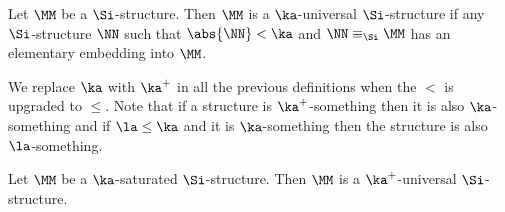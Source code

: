 \begin{dfn}[$\ka$-universality]
    Let $\MM$ be a $\Si$-structure.
    Then $\MM$ is a $\ka$-universal $\Si$-structure if 
    any $\Si$-structure $\NN$ such that $\abs{\NN} < \ka$ and 
    $\NN \equiv_\Si \MM$ has an elementary 
    embedding into $\MM$.
\end{dfn}

\begin{nttn}
    We replace $\ka$ with $\ka^+$ in all the previous definitions
    when the $<$ is upgraded to $\leq$.
    Note that if a structure is $\ka^+$-something then it is also 
    $\ka$-something and if $\la \leq \ka$ and it is $\ka$-something 
    then the structure is also $\la$-something.
\end{nttn}

\begin{lem}
    Let $\MM$ be a $\ka$-saturated $\Si$-structure.
    Then $\MM$ is a $\ka^+$-universal $\Si$-structure.
\end{lem}
